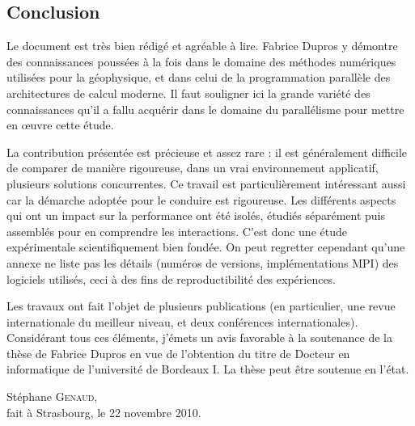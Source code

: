 \documentclass[a4paper,12pt]{article}
\begin{document}
\subsection*{Conclusion}

Le document est très bien rédigé et agréable à lire. 
Fabrice Dupros y démontre des connaissances poussées à la fois dans le 
domaine des méthodes numériques utilisées pour la géophysique, et
dans celui de la programmation parallèle des architectures 
de calcul moderne. 
Il faut souligner ici la grande variété des connaissances qu'il a
fallu acquérir dans le domaine du parallélisme pour mettre en {\oe}uvre
cette étude. 

La contribution présentée est précieuse et assez rare : il est 
généralement difficile de comparer de manière rigoureuse, dans
un vrai environnement applicatif, plusieurs solutions concurrentes.
Ce travail est particulièrement intéressant aussi car la démarche
adoptée pour le conduire est rigoureuse. Les différents aspects
qui ont un impact sur la performance ont été isolés, étudiés séparément
puis assemblés pour en comprendre les interactions. C'est donc 
une étude expérimentale scientifiquement bien fondée. On peut regretter
cependant qu'une annexe ne liste pas les détails (numéros de versions, 
implémentations MPI) des logiciels utilisés, ceci à des fins de 
reproductibilité des expériences.

Les travaux ont fait l'objet de plusieurs publications (en particulier,
une revue internationale du meilleur niveau, et deux conférences internationales).
Considérant tous ces éléments, j'émets un avis favorable à la soutenance de 
la thèse de Fabrice Dupros en vue de l'obtention du titre de Docteur 
en informatique de l'université de Bordeaux I. La thèse peut être
soutenue en l'état.

\vspace{.8cm}
\begin{flushright}
Stéphane \textsc{Genaud},\\
{\small fait à Strasbourg, le 22 novembre 2010}.\\
\end{flushright}
\end{document}
